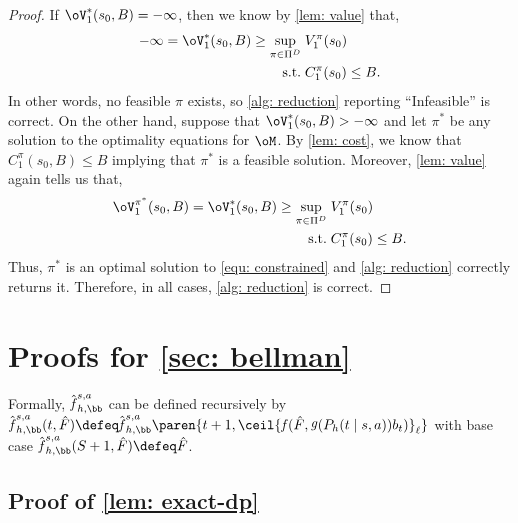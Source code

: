 \documentclass[pdftex, a4paper, 12pt]{article}
\newcommand{\round}[2]{\ceil{#2}_{#1}}
\newcommand{\hF}{\hat{F}}
\DeclareMathOperator*{\f}{\mathit{f}}
\DeclareMathOperator*{\g}{\mathit{g}}
\begin{document}
\begin{proof}
    If $\oV^*_{1}(s_0, B) = -\infty$, then we know by \cref{lem: value} that,
    \begin{equation}
        \begin{split}
            -\infty = \oV^*_1(s_0,B) \geq \sup_{\pi \in \Pi^D}&\; V_1^{\pi}(s_0) \\
            \text{s.t.}&\; C_1^{\pi}(s_0) \leq B.
        \end{split}
    \end{equation}
    In other words, no feasible $\pi$ exists, so \cref{alg: reduction} reporting ``Infeasible'' is correct. On the other hand, suppose that $\oV^*_{1}(s_0, B) > -\infty$ and let $\pi^*$ be any solution to the optimality equations for $\oM$. By \cref{lem: cost}, we know that $C^{\pi}_1(s_0, B) \leq B$ implying that $\pi^*$ is a feasible solution. Moreover, \cref{lem: value} again tells us that,
        \begin{equation}
        \begin{split}
            \oV^{\pi^*}_1(s_0,B) = \oV^*_1(s_0,B) \geq \sup_{\pi \in \Pi^D}&\; V_1^{\pi}(s_0) \\
            \text{s.t.}&\; C_1^{\pi}(s_0) \leq B.
        \end{split}
    \end{equation}
    Thus, $\pi^*$ is an optimal solution to \eqref{equ: constrained} and \cref{alg: reduction} correctly returns it. Therefore, in all cases, \cref{alg: reduction} is correct.
\end{proof}

\section{Proofs for \texorpdfstring{\cref{sec: bellman}}{sec: bellman}}

Formally, $\hat{\f}_{h,\bb}^{s,a}$ can be defined recursively by $\hat{\f}_{h,\bb}^{s,a}(t,\hF) \defeq \hat{\f}_{h,\bb}^{s,a}\paren{t+1, \round{\ell}{\f(\hF, \g(P_h(t \mid s,a))b_t)}}$ with base case $\hat{\f}_{h,\bb}^{s,a}(S+1, \hF) \defeq \hF$.


\subsection{Proof of \texorpdfstring{\cref{lem: exact-dp}}{lem: exact-dp}}
\end{document}
